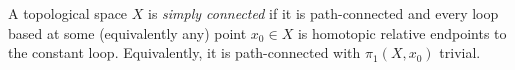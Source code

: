 
A topological space $X$ is \emph{simply connected} if it is path-connected and every loop based at some (equivalently any) point $x_0\in X$ is homotopic relative endpoints to the constant loop. Equivalently, it is path-connected with $\pi_1(X,x_0)$ trivial.
